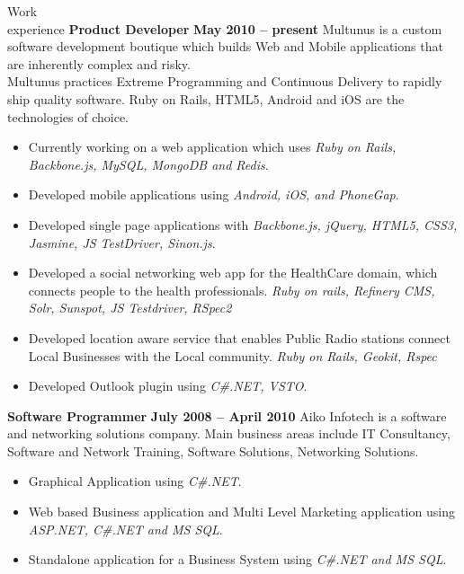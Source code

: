 \documentclass{resume}
\begin{document}
\begin{category}{Work \\experience}
  \citemnobullet \textbf{Product Developer} \hfill \textbf{May 2010 -- present}
  \citemnobullet Multunus is a custom software development boutique
  which builds Web and Mobile applications that are inherently
  complex and risky.\\Multunus practices Extreme Programming and Continuous
  Delivery to rapidly ship quality software. Ruby on Rails, HTML5, Android and iOS are the technologies of choice.
  \begin{itemize}
  \item Currently working on a web application which uses {\em Ruby on Rails, Backbone.js, MySQL, MongoDB and Redis}.
  \item Developed mobile applications using {\em Android, iOS, and PhoneGap}.
  \item Developed single page applications with {\em Backbone.js, jQuery, HTML5, CSS3, Jasmine, JS TestDriver, Sinon.js}.
  \item Developed a social networking web app for the HealthCare
    domain, which connects people to the health professionals. {\em Ruby on rails, Refinery CMS, Solr, Sunspot, JS Testdriver, RSpec2}
  \item Developed location aware service that enables Public Radio
    stations connect Local Businesses with the Local community. {\em Ruby on Rails, Geokit, Rspec}
  \item Developed Outlook plugin using {\em C\#.NET, VSTO}.
  \end{itemize}
  \citemnobullet \textbf{Software Programmer} \hfill \textbf{July 2008 -- April 2010}
  \citemnobullet Aiko Infotech is a software and networking solutions
  company. Main business areas include IT Consultancy, Software and Network
  Training, Software Solutions, Networking Solutions.
  \begin{itemize} 
  \item Graphical Application using {\em C\#.NET}. 
  \item Web based Business application and Multi Level Marketing
    application using {\em ASP.NET, C\#.NET and MS SQL}.
  \item Standalone application for a Business System using {\em C\#.NET and MS SQL}.
  \end{itemize}
\end{category}
\end{document}
